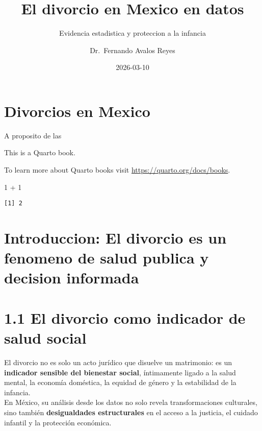 \documentclass[
  letterpaper,
  DIV=11,
  numbers=noendperiod]{scrreprt}
\title{El divorcio en Mexico en datos}
\subtitle{Evidencia estadistica y proteccion a la infancia}
\author{Dr.~Fernando Avalos Reyes}
\date{2026-03-10}
\newenvironment{Shaded}{\begin{snugshade}}{\end{snugshade}}
\newcommand{\DecValTok}[1]{\textcolor[rgb]{0.68,0.00,0.00}{#1}}
\newcommand{\SpecialCharTok}[1]{\textcolor[rgb]{0.37,0.37,0.37}{#1}}
\renewcommand*\contentsname{Table of contents}
\newcommand\contentsname{Table of contents}
\begin{document}
\maketitle

\renewcommand*\contentsname{Table of contents}
{
\hypersetup{linkcolor=}
\setcounter{tocdepth}{2}
\tableofcontents
}


\chapter*{Divorcios en Mexico}\label{divorcios-en-mexico}


A proposito de las

This is a Quarto book.

To learn more about Quarto books visit
\url{https://quarto.org/docs/books}.

\begin{Shaded}
\begin{Highlighting}[]
\DecValTok{1} \SpecialCharTok{+} \DecValTok{1}
\end{Highlighting}
\end{Shaded}

\begin{verbatim}
[1] 2
\end{verbatim}


\chapter{Introduccion: El divorcio es un fenomeno de salud publica y
decision
informada}\label{introduccion-el-divorcio-es-un-fenomeno-de-salud-publica-y-decision-informada}


\chapter{1.1 El divorcio como indicador de salud
social}\label{el-divorcio-como-indicador-de-salud-social}

El divorcio no es solo un acto jurídico que disuelve un matrimonio: es
un \textbf{indicador sensible del bienestar social}, íntimamente ligado
a la salud mental, la economía doméstica, la equidad de género y la
estabilidad de la infancia.\\
En México, su análisis desde los datos no solo revela transformaciones
culturales, sino también \textbf{desigualdades estructurales} en el
acceso a la justicia, el cuidado infantil y la protección económica.
\end{document}
